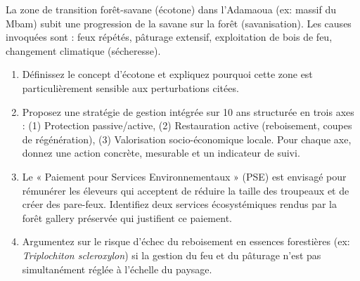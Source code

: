 \documentclass[11pt]{article}
\begin{document}
\begin{exercice}
La zone de transition forêt-savane (écotone) dans l'Adamaoua (ex: massif du Mbam) subit une progression de la savane sur la forêt (savanisation). Les causes invoquées sont : feux répétés, pâturage extensif, exploitation de bois de feu, changement climatique (sécheresse).

\begin{enumerate}
\item Définissez le concept d'écotone et expliquez pourquoi cette zone est particulièrement sensible aux perturbations citées.
\item Proposez une stratégie de gestion intégrée sur 10 ans structurée en trois axes : (1) Protection passive/active, (2) Restauration active (reboisement, coupes de régénération), (3) Valorisation socio-économique locale. Pour chaque axe, donnez une action concrète, mesurable et un indicateur de suivi.
\item Le « Paiement pour Services Environnementaux » (PSE) est envisagé pour rémunérer les éleveurs qui acceptent de réduire la taille des troupeaux et de créer des pare-feux. Identifiez deux services écosystémiques rendus par la forêt gallery préservée qui justifient ce paiement.
\item Argumentez sur le risque d'échec du reboisement en essences forestières (ex: \textit{Triplochiton scleroxylon}) si la gestion du feu et du pâturage n'est pas simultanément réglée à l'échelle du paysage.
\end{enumerate}
\end{exercice}
\end{document}
